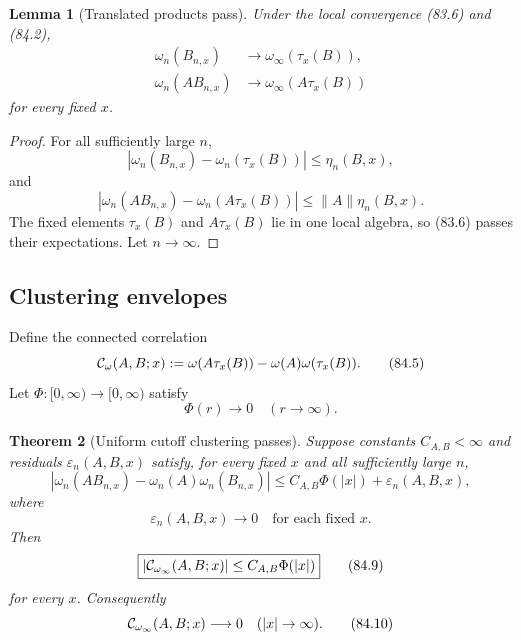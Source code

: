 \documentclass[11pt]{article}
\newtheorem{theorem}{Theorem}[section]
\newtheorem{lemma}[theorem]{Lemma}
\theoremstyle{remark}
\begin{document}
\begin{lemma}[Translated products pass]
\label{lem:v12v84-products}
Under the local convergence (83.6) and (84.2),
\begin{align}
 \omega_n(B_{n,x})&\longrightarrow
 \omega_\infty(\tau_x(B)),                                  \tag{84.3}\\
 \omega_n(AB_{n,x})&\longrightarrow
 \omega_\infty(A\tau_x(B))                                  \tag{84.4}
\end{align}
for every fixed \(x\).
\end{lemma}

\begin{proof}
For all sufficiently large \(n\),
\[
 |\omega_n(B_{n,x})-\omega_n(\tau_x(B))|
 \leq\eta_n(B,x),
\]
and
\[
 |\omega_n(AB_{n,x})-\omega_n(A\tau_x(B))|
 \leq\|A\|\eta_n(B,x).
\]
The fixed elements \(\tau_x(B)\) and \(A\tau_x(B)\) lie in one local
algebra, so (83.6) passes their expectations.  Let \(n\to\infty\).
\end{proof}

\subsection{Clustering envelopes}

Define the connected correlation
\begin{equation}
 {\cal C}_\omega(A,B;x)
 :=
 \omega(A\tau_x(B))-\omega(A)\omega(\tau_x(B)).              \tag{84.5}
\end{equation}
Let \(\Phi:[0,\infty)\to[0,\infty)\) satisfy
\[
                              \Phi(r)\longrightarrow0
                              \quad(r\to\infty).              \tag{84.6}
\]

\begin{theorem}[Uniform cutoff clustering passes]
\label{thm:v12v84-clustering}
Suppose constants \(C_{A,B}<\infty\) and residuals
\(\varepsilon_n(A,B,x)\) satisfy, for every fixed \(x\) and all
sufficiently large \(n\),
\begin{equation}
 \left|
 \omega_n(AB_{n,x})-\omega_n(A)\omega_n(B_{n,x})
 \right|
 \leq C_{A,B}\Phi(|x|)
      +\varepsilon_n(A,B,x),                                \tag{84.7}
\end{equation}
where
\begin{equation}
                         \varepsilon_n(A,B,x)\longrightarrow0
                         \quad\text{for each fixed }x.       \tag{84.8}
\end{equation}
Then
\begin{equation}
 \boxed{\displaystyle
 |{\cal C}_{\omega_\infty}(A,B;x)|
 \leq C_{A,B}\Phi(|x|)}                                     \tag{84.9}
\end{equation}
for every \(x\).  Consequently
\[
                         {\cal C}_{\omega_\infty}(A,B;x)
                         \longrightarrow0
                         \quad(|x|\to\infty).                \tag{84.10}
\]
\end{theorem}
\end{document}
